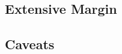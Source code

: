 %

\subsection{Extensive Margin}\label{sec:b2b_leakage:extensive}


\subsection{Caveats}\label{sec:b2b_leakage:caveats}

